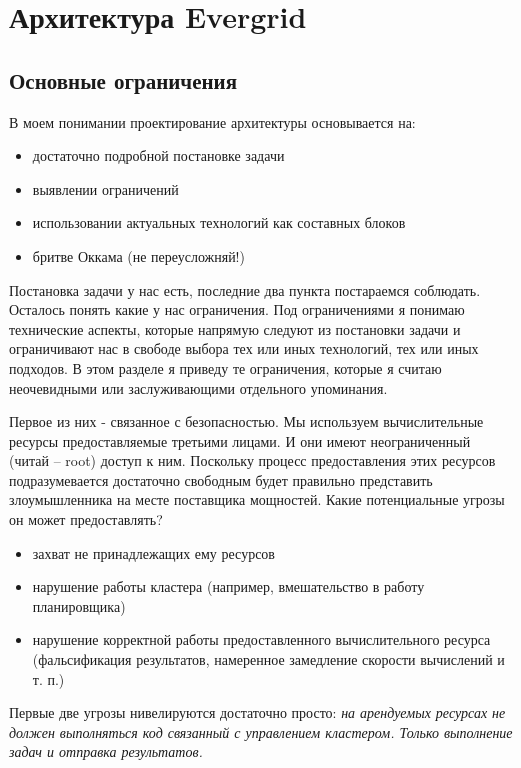 \chapter{Архитектура Evergrid}

\section{Основные ограничения}

В моем понимании проектирование архитектуры основывается на:

\begin{itemize}
	\item достаточно подробной постановке задачи
	\item выявлении ограничений
	\item использовании актуальных технологий как составных блоков
	\item бритве Оккама (не переусложняй!)
\end{itemize}

Постановка задачи у нас есть, последние два пункта постараемся соблюдать. Осталось понять какие у нас ограничения. Под ограничениями я понимаю технические аспекты, которые напрямую следуют из постановки задачи и ограничивают нас в свободе выбора тех или иных технологий, тех или иных подходов. В этом разделе я приведу те ограничения, которые я считаю неочевидными или заслуживающими отдельного упоминания.

Первое из них - связанное с безопасностью. Мы используем вычислительные ресурсы предоставляемые третьими лицами. И они имеют неограниченный (читай -- root) доступ к ним. Поскольку процесс предоставления этих ресурсов подразумевается достаточно свободным будет правильно представить злоумышленника на месте поставщика мощностей. Какие потенциальные угрозы он может предоставлять?

\begin{itemize}
	\item захват не принадлежащих ему ресурсов
	\item нарушение работы кластера (например, вмешательство в работу планировщика)
	\item нарушение корректной работы предоставленного вычислительного ресурса (фальсификация результатов, намеренное замедление скорости вычислений и т. п.)
\end{itemize}

Первые две угрозы нивелируются достаточно просто: \textit{на арендуемых ресурсах не должен выполняться код связанный с управлением кластером. Только выполнение задач и отправка результатов.}

